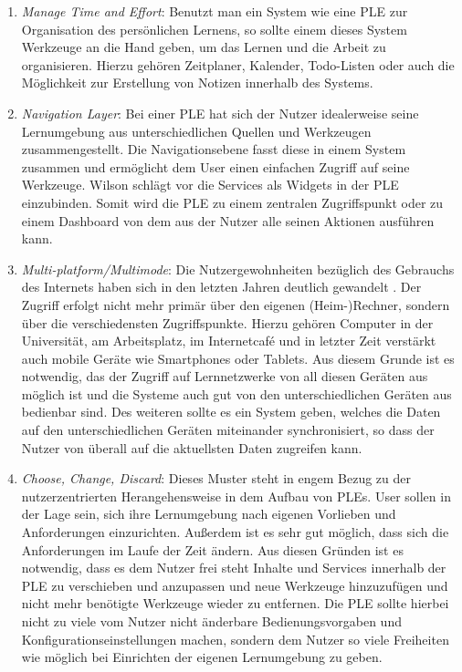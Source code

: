 \begin{enumerate}
 \item \emph{Manage Time and Effort}\label{wilson_patterns:manage_time_effort}: Benutzt man ein System wie eine PLE zur Organisation des persönlichen Lernens, so sollte einem dieses System Werkzeuge an die Hand geben, um das Lernen und die Arbeit zu organisieren. Hierzu gehören Zeitplaner, Kalender, Todo-Listen oder auch die Möglichkeit zur Erstellung von Notizen innerhalb des Systems.
 \item \emph{Navigation Layer}\label{wilson_patterns:navigation_layer}: Bei einer PLE hat sich der Nutzer idealerweise seine Lernumgebung aus unterschiedlichen Quellen und Werkzeugen zusammengestellt. Die Navigationsebene fasst diese in einem System zusammen und ermöglicht dem User einen einfachen Zugriff auf seine Werkzeuge. Wilson schlägt vor die Services als Widgets in der PLE einzubinden. Somit wird die PLE zu einem zentralen Zugriffspunkt oder zu einem Dashboard von dem aus der Nutzer alle seinen Aktionen ausführen kann. 
 \item \emph{Multi-platform/Multimode}\label{wilson_patterns:multimode}: Die Nutzergewohnheiten bezüglich des Gebrauchs des Internets haben sich in den letzten Jahren deutlich gewandelt \cite{VanHarmelen}. Der Zugriff erfolgt nicht mehr primär über den eigenen (Heim-)Rechner, sondern über die verschiedensten Zugriffspunkte. Hierzu gehören Computer in der Universität, am Arbeitsplatz, im Internetcafé und in letzter Zeit verstärkt auch mobile Geräte wie Smartphones oder Tablets. Aus diesem Grunde ist es notwendig, das der Zugriff auf Lernnetzwerke von all diesen Geräten aus möglich ist und die Systeme auch gut von den unterschiedlichen Geräten aus bedienbar sind. Des weiteren sollte es ein System geben, welches die Daten auf den unterschiedlichen Geräten miteinander synchronisiert, so dass der Nutzer von überall auf die aktuellsten Daten zugreifen kann.
 \item \emph{Choose, Change, Discard}\label{wilson_patterns:choose_change_discard}: Dieses Muster steht in engem Bezug zu der nutzerzentrierten Herangehensweise in dem Aufbau von PLEs. User sollen in der Lage sein, sich ihre Lernumgebung nach eigenen Vorlieben und Anforderungen einzurichten. Außerdem ist es sehr gut möglich, dass sich die Anforderungen im Laufe der Zeit ändern. Aus diesen Gründen ist es notwendig, dass es dem Nutzer frei steht Inhalte und Services innerhalb der PLE zu verschieben und anzupassen und neue Werkzeuge hinzuzufügen und nicht mehr benötigte Werkzeuge wieder zu entfernen. Die PLE sollte hierbei nicht zu viele vom Nutzer nicht änderbare Bedienungsvorgaben und Konfigurationseinstellungen machen, sondern dem Nutzer so viele Freiheiten wie möglich bei Einrichten der eigenen Lernumgebung zu geben.
\end{enumerate}

